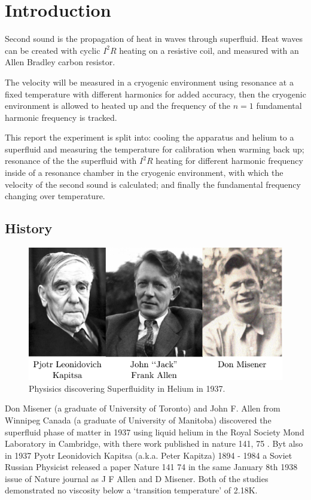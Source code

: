 \section{Introduction}
Second sound is the propagation of heat in waves through superfluid.
Heat waves can be created with cyclic $I^2 R$ heating on a resistive coil,
and measured with an Allen Bradley carbon resistor.

The velocity will be measured in a cryogenic environment using resonance at a fixed
temperature with different harmonics for added accuracy, then the cryogenic environment
is allowed to heated up and the frequency of the
$n=1$ fundamental harmonic frequency is tracked.

This report the experiment is split into: cooling the apparatus and helium to a
superfluid and measuring the temperature for calibration when warming back up;
resonance of the the superfluid with $I^2 R$ heating for different harmonic
frequency inside of a resonance chamber in the
cryogenic environment, with which the velocity of the second sound is calculated;
and finally the fundamental frequency changing over temperature.

\subsection{History}

\begin{figure}[htbp]
\centering
\includegraphics{pics/history.pdf}
\caption{ Physisics discovering Superfluidity in Helium in 1937. \label{fig:history}}
\end{figure}

Don Misener (a graduate of University of Toronto) and
John F. Allen  from Winnipeg Canada\cite{disofsuper} (a graduate of University of Manitoba) %
discovered the superfluid phase of matter in 1937 using liquid helium in the
Royal Society Mond Laboratory in Cambridge, with there work published in nature 141, 75 \cite{allenandmisenernature}. %
Byt also in 1937 Pyotr Leonidovich Kapitsa (a.k.a. Peter Kapitza) 1894 - 1984 a Soviet
Russian Physicist released a paper Nature 141 74 in the same January 8th 1938 issue of Nature
journal as J F Allen and D Misener. 
Both of the studies demonstrated no viscosity below a `transition temperature’ of 2.18K.

